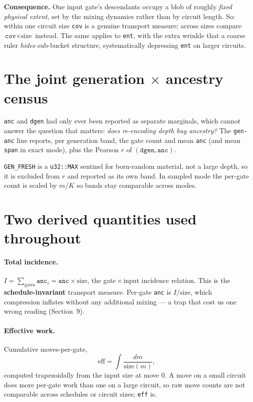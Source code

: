 \documentclass[11pt]{article}
\begin{document}
\medskip
\noindent\textbf{Consequence.} One input gate's descendants occupy a blob of
roughly \emph{fixed physical extent}, set by the mixing dynamics rather than by
circuit length. So: within one circuit size \texttt{cov} is a genuine transport
measure; across sizes compare $\texttt{cov}\times\text{size}$ instead. The same
applies to \texttt{ent}, with the extra wrinkle that a coarse ruler \emph{hides}
sub-bucket structure, systematically depressing \texttt{ent} on larger circuits.

\section{The joint generation $\times$ ancestry census}

\texttt{anc} and \texttt{dgen} had only ever been reported as separate
marginals, which cannot answer the question that matters: \emph{does re-encoding
depth buy ancestry?} The \texttt{gen-anc} line reports, per generation band, the
gate count and mean \texttt{anc} (and mean \texttt{span} in exact mode), plus the
Pearson $r$ of $(\texttt{dgen}, \texttt{anc})$.

\texttt{GEN\_FRESH} is a \texttt{u32::MAX} sentinel for born-random material, not
a large depth, so it is excluded from $r$ and reported as its own band. In
sampled mode the per-gate count is scaled by $m/K$ so bands stay comparable
across modes.

\section{Two derived quantities used throughout}

\paragraph{Total incidence.} $I = \sum_{\text{gates}} \texttt{anc}_i =
\overline{\texttt{anc}} \times \text{size}$, the gate\,$\times$\,input incidence
relation. This is the \textbf{schedule-invariant} transport measure. Per-gate
\texttt{anc} is $I/\text{size}$, which compression inflates without any
additional mixing --- a trap that cost us one wrong reading (Section~9).

\paragraph{Effective work.} Cumulative moves-per-gate,
\[
  \mathrm{eff} = \int \frac{dm}{\text{size}(m)},
\]
computed trapezoidally from the input size at move 0. A move on a small circuit
does more per-gate work than one on a large circuit, so raw move counts are not
comparable across schedules or circuit sizes; \texttt{eff} is.
\end{document}
